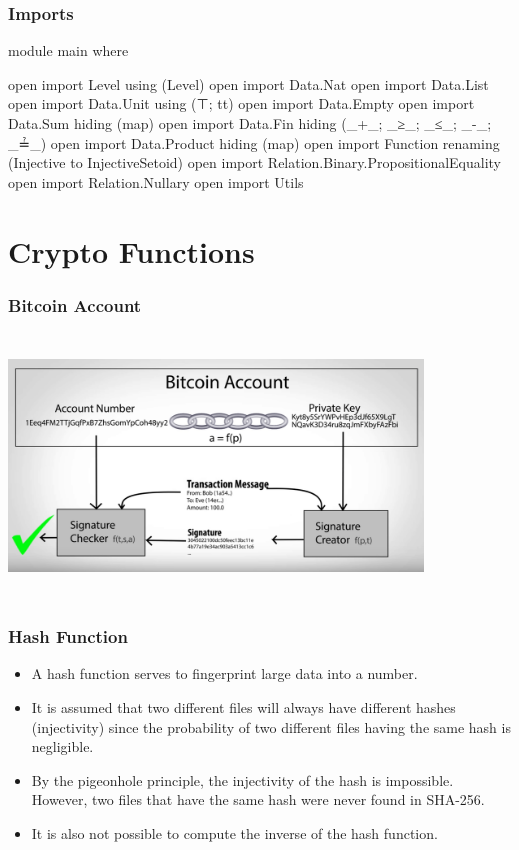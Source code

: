 \documentclass{beamer}
\begin{document}
\begin{frame}
  \frametitle{Imports}
\begin{code}

module main where

open import Level using (Level)
open import Data.Nat
open import Data.List
open import Data.Unit using (⊤; tt)
open import Data.Empty
open import Data.Sum hiding (map)
open import Data.Fin hiding (_+_; _≥_; _≤_; _-_; _≟_)
open import Data.Product hiding (map)
open import Function renaming (Injective to InjectiveSetoid)
open import Relation.Binary.PropositionalEquality
open import Relation.Nullary
open import Utils

\end{code}
\end{frame}

\section{Crypto Functions}

\begin{frame}
  \frametitle{Bitcoin Account}
    \includegraphics[width=11cm, height=7cm]{privatekey}
\end{frame}

\begin{frame}
  \frametitle{Hash Function}
  \begin{itemize}[<+->]
    \item A hash function serves to fingerprint large data into a number.
    \item It is assumed that two different files will always have different hashes (injectivity)
   since the probability of two different files having the same hash is negligible.
    \item By the pigeonhole principle, the injectivity of the hash is impossible.
      However, two files that have the same hash were never found in SHA-256.
    \item It is also not possible to compute the inverse of the hash function.
  \end{itemize}
\end{frame}
\end{document}
